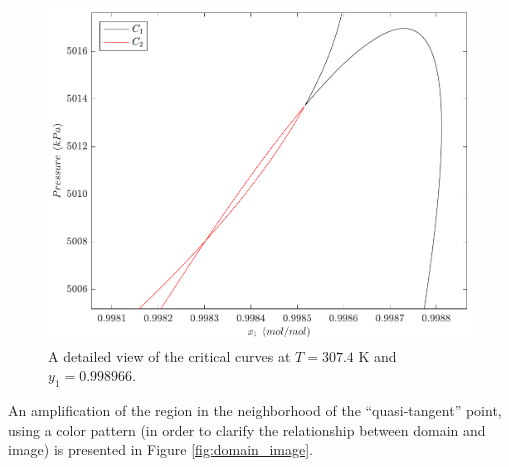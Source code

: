 \documentclass[journal=iecred,manuscript=article]{achemso}
\theoremstyle{definition}
\theoremstyle{remark}
\begin{document}
\begin{figure}
	\begin{center}
		\includegraphics[scale=0.50]{curvas_criticas_dominio_new.pdf}
		\caption{A detailed view of the critical curves at $ T = 307.4 $ K and $ y_{1} = 0.998966 $.}\label{fig:sinais}
	\end{center}
\end{figure}
 
\noindent An amplification of the region in the neighborhood of the \enquote{quasi-tangent} point, using a color pattern (in order to clarify the relationship between domain and image) is presented in Figure \ref{fig:domain_image}.
\end{document}
